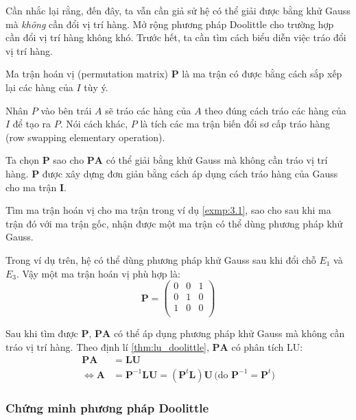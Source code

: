 \documentclass[../../Lectures]{subfiles}
\begin{document}
Cần nhắc lại rằng, đến đây, ta vẫn cần giả sử hệ có thể giải được bằng khử Gauss
mà \emph{không} cần đổi vị trí hàng. Mở rộng phương pháp Doolittle cho trường
hợp cần đổi vị trí hàng không khó. Trước hết, ta cần tìm cách biểu diễn việc
tráo đổi vị trí hàng.

\begin{definition}
    Ma trận hoán vị (permutation matrix) \(\bm{P}\) là ma trận có được bằng cách
    sắp xếp lại các hàng của \(I\) tùy ý.
\end{definition}

Nhân \(P\) vào bên trái \(A\) sẽ tráo các hàng của \(A\) theo đúng cách tráo các
hàng của \(I\) để tạo ra \(P\). Nói cách khác, \(P\) là tích các ma trận biến
đổi sơ cấp tráo hàng (row swapping elementary operation).

Ta chọn \(\bm{P}\) sao cho \(\bm{PA}\) có thể giải bằng khử Gauss mà không cần
tráo vị trí hàng. \(\bm{P}\) được xây dựng đơn giản bằng cách áp dụng cách tráo
hàng của Gauss cho ma trận \(\bm{I}\).

\begin{exmp}
    Tìm ma trận hoán vị cho ma trận trong ví dụ \ref{exmp:3.1}, sao cho sau khi
    ma trận đó với ma trận gốc, nhận được một ma trận có thể dùng phương pháp
    khử Gauss.

    Trong ví dụ trên, hệ có thể dùng phương pháp khử Gauss sau khi đổi chỗ
    \(E_1\) và \(E_3\). Vậy một ma trận hoán vị phù hợp là:
    \[
        \bm{P} =
            \begin{pmatrix}
                0  &  0  &  1  \\
                0  &  1  &  0  \\
                1  &  0  &  0  \\
            \end{pmatrix}
    \]
\end{exmp}

Sau khi tìm được \(\bm{P}\), \(\bm{PA}\) có thể áp dụng phương pháp khử Gauss mà
không cần tráo vị trí hàng. Theo định lí \ref{thm:lu_doolittle}, \(\bm{PA}\) có
phân tích LU:
\begin{align*}
        \bm{PA} &= \bm{LU} \\
    \iff \bm{A} &= \bm{P}^{-1} \bm{LU} = (\bm{P}^t \bm{L}) \bm{U} \, \text{(do \(\bm{P}^{-1} = \bm{P}^t\))}
\end{align*}

\subsubsection{Chứng minh phương pháp Doolittle}
\end{document}
